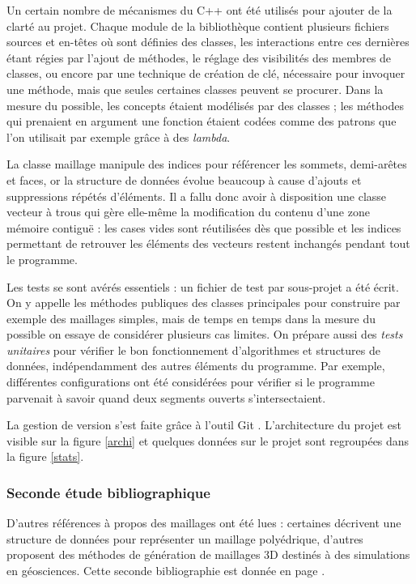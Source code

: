 \documentclass[12pt,a4paper]{report}
\begin{document}
Un certain nombre de mécanismes du C++ ont été utilisés pour ajouter de la clarté au projet. Chaque module de la bibliothèque contient plusieurs fichiers sources et en-têtes où sont définies des classes, les interactions entre ces dernières étant régies par l'ajout de méthodes, le réglage des visibilités des membres de classes, ou encore par une technique de création de clé, nécessaire pour invoquer une méthode, mais que seules certaines classes peuvent se procurer. Dans la mesure du possible, les concepts étaient modélisés par des classes ; les méthodes qui prenaient en argument une fonction étaient codées comme des patrons que l'on utilisait par exemple grâce à des \emph{lambda}.

La classe maillage manipule des indices pour référencer les sommets, demi-arêtes et faces, or la structure de données évolue beaucoup à cause d'ajouts et suppressions répétés d'éléments. Il a fallu donc avoir à disposition une classe \og vecteur à trous \fg{} qui gère elle-même la modification du contenu d'une zone mémoire contiguë : les cases vides sont réutilisées dès que possible et les indices permettant de retrouver les éléments des vecteurs restent inchangés pendant tout le programme.

Les tests se sont avérés essentiels : un fichier de test par sous-projet a été écrit. On y appelle les méthodes publiques des classes principales pour construire par exemple des maillages simples, mais de temps en temps dans la mesure du possible on essaye de considérer plusieurs cas limites. On prépare aussi des \emph{tests unitaires} pour vérifier le bon fonctionnement d'algorithmes et structures de données, indépendamment des autres éléments du programme. Par exemple, différentes configurations ont été considérées pour vérifier si le programme parvenait à savoir quand deux segments ouverts s'intersectaient.

\vspace{1cm}
La gestion de version s'est faite grâce à l'outil Git \cite{Git}.
L'architecture du projet est visible sur la figure \ref{archi} et quelques données sur le projet sont regroupées dans la figure \ref{stats}.

\subsubsection{Seconde étude bibliographique}

D'autres références à propos des maillages ont été lues : certaines décrivent une structure de données pour représenter un maillage polyédrique, d'autres proposent des méthodes de génération de maillages 3D destinés à des simulations en géosciences. Cette seconde bibliographie est donnée en page \pageref{second_biblio}.
\end{document}
